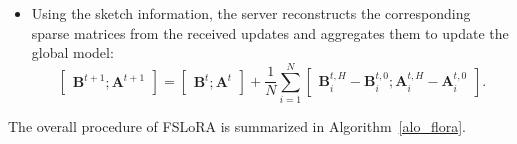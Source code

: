 \documentclass{article} %
\theoremstyle{plain}
\theoremstyle{definition}
\begin{document}
\begin{itemize}[topsep=0pt,itemsep=4pt,parsep=0pt, partopsep=0pt, leftmargin=*]
    \item Using the sketch information, the server reconstructs the corresponding sparse matrices from the received updates and aggregates them to update the global model:
\begin{equation}\label{model_aggregation}
\begin{bmatrix}
\mathbf{B}^{t+1};
\mathbf{A}^{t+1}
\end{bmatrix}
=
\begin{bmatrix}
\mathbf{B}^{t};
\mathbf{A}^{t}
\end{bmatrix}
+
\frac{1}{N} \sum_{i=1}^N
\begin{bmatrix}
\mathbf{B}_i^{t,H} - \mathbf{B}_i^{t,0};
\mathbf{A}_i^{t,H} - \mathbf{A}_i^{t,0}
\end{bmatrix}.
\end{equation}
\end{itemize}
The overall procedure of FSLoRA is summarized in Algorithm~\ref{alo_flora}.
\end{document}
